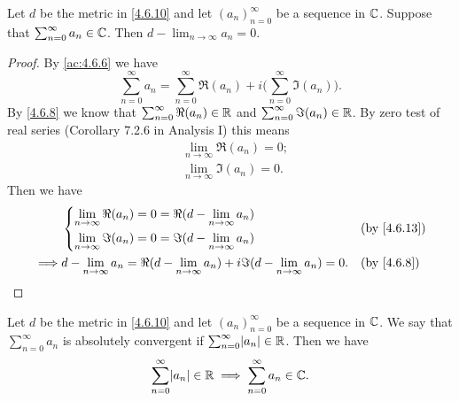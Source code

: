 \begin{ac}\label{ac:4.6.7}
  Let \(d\) be the metric in \cref{4.6.10} and let \((a_n)_{n = 0}^\infty\) be a sequence in \(\mathbb{C}\).
  Suppose that \(\sum_{n = 0}^\infty a_n \in \mathbb{C}\).
  Then \(d - \lim_{n \to \infty} a_n = 0\).
\end{ac}

\begin{proof}
  By \cref{ac:4.6.6} we have
  \[
    \sum_{n = 0}^\infty a_n = \sum_{n = 0}^\infty \Re(a_n) + i \bigg(\sum_{n = 0}^\infty \Im(a_n)\bigg).
  \]
  By \cref{4.6.8} we know that \(\sum_{n = 0}^\infty \Re(a_n) \in \mathbb{R}\) and \(\sum_{n = 0}^\infty \Im(a_n) \in \mathbb{R}\).
  By zero test of real series (Corollary 7.2.6 in Analysis I) this means
  \begin{align*}
     & \lim_{n \to \infty} \Re(a_n) = 0; \\
     & \lim_{n \to \infty} \Im(a_n) = 0.
  \end{align*}
  Then we have
  \begin{align*}
             & \begin{dcases}
                 \lim_{n \to \infty} \Re(a_n) = 0 = \Re(d - \lim_{n \to \infty} a_n) \\
                 \lim_{n \to \infty} \Im(a_n) = 0 = \Im(d - \lim_{n \to \infty} a_n)
               \end{dcases}                                   &  & \text{(by \cref{4.6.13})}                                            \\
    \implies & d - \lim_{n \to \infty} a_n = \Re(d - \lim_{n \to \infty} a_n) + i \Im(d - \lim_{n \to \infty} a_n) = 0. &  & \by{4.6.8}
  \end{align*}
\end{proof}

\begin{ac}\label{ac:4.6.8}
  Let \(d\) be the metric in \cref{4.6.10} and let \((a_n)_{n = 0}^\infty\) be a sequence in \(\mathbb{C}\).
  We say that \(\sum_{n = 0}^\infty a_n\) is absolutely convergent if \(\sum_{n = 0}^\infty \abs{a_n} \in \R\).
  Then we have
  \[
    \sum_{n = 0}^\infty \abs{a_n} \in \R \implies \sum_{n = 0}^\infty a_n \in \C.
  \]
\end{ac}


